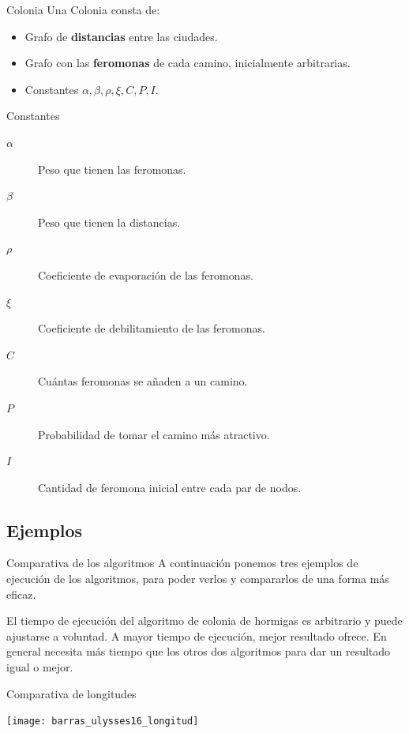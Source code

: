 \begin{frame}{Colonia}
Una Colonia consta de:
\begin{itemize}
  \item Grafo de \textbf{distancias} entre las ciudades.
  \item Grafo con las \textbf{feromonas} de cada camino, inicialmente arbitrarias.
  \item Constantes $\alpha, \beta, \rho, \xi, C, P, I$.
\end{itemize}
\end{frame}

\begin{frame}{Constantes}
\begin{description}
  \item[$\alpha$] Peso que tienen las feromonas.
  \item[$\beta$] Peso que tienen la distancias.
  \item[$\rho$] Coeficiente de evaporación de las feromonas.
  \item[$\xi$] Coeficiente de debilitamiento de las feromonas.
  \item[$C$] Cuántas feromonas se añaden a un camino.
  \item[$P$] Probabilidad de tomar el camino más atractivo.
  \item[$I$] Cantidad de feromona inicial entre cada par de nodos.
\end{description}
\end{frame}

\subsection{Ejemplos}
\begin{frame}{Comparativa de los algoritmos}
  A continuación ponemos tres ejemplos de ejecución de los algoritmos, para poder verlos y compararlos de una forma más eficaz.
  
  El tiempo de ejecución del algoritmo de colonia de hormigas es arbitrario y puede ajustarse a voluntad. A mayor tiempo de ejecución, mejor resultado ofrece. En general necesita más tiempo que los otros dos algoritmos para dar un resultado igual o mejor.
\end{frame}

\begin{frame}{Comparativa de longitudes}
	\begin{center}
		\texttt{[image: barras\_ulysses16\_longitud]}
	\end{center}
\end{frame}

